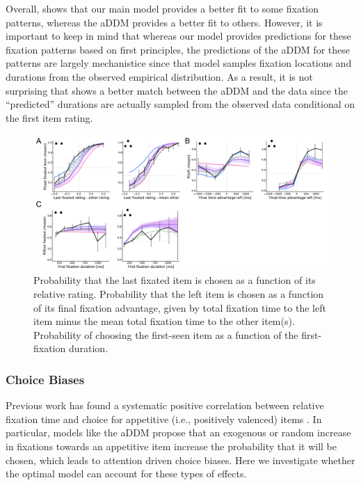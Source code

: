 Overall,  shows that our main model provides a better fit to some fixation patterns, whereas the aDDM provides a better fit to others. However, it is important to keep in mind that whereas our model provides predictions for these fixation patterns based on first principles, the predictions of the aDDM for these patterns are largely mechanistice since that model samples fixation locations and durations from the observed empirical distribution. As a result, it is not surprising that  shows a better match between the aDDM and the data since the ``predicted'' durations are actually sampled from the observed data conditional on the first item rating.


\begin{figure}[t!]
  \centering
  \includegraphics[width=\textwidth]{figs/attention/Fig7.pdf}
  \caption{
   Probability that the last fixated item is chosen as a function of its relative rating.
   Probability that the left item is chosen as a function of its final fixation advantage, given by total fixation time to the left item minus the mean total fixation time to the other item(s).
   Probability of choosing the first-seen item as a function of the first-fixation duration.
  }
  \label{fig:attention7}
\end{figure}

\subsubsection{Choice Biases}

Previous work has found a systematic positive correlation between relative fixation time and choice for appetitive (i.e., positively valenced) items \citep{shimojo2003gaze,armel2008neuroeconomic,armel2008biasing,krajbich2010visual,krajbich2011multialternative, gluth2020valuebased}. In particular, models like the aDDM propose that an exogenous or random increase in fixations towards an appetitive item increase the probability that it will be chosen, which leads to attention driven choice biases.  Here we investigate whether the optimal model can account for these types of effects.

